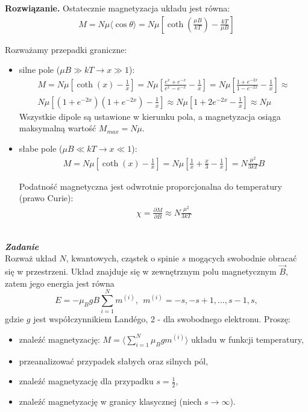 \documentclass[11pt,a4paper]{article}
\newcounter{zadanie}\newcommand{\zadanie}[1][]{\addtocounter{zadanie}{1} ~\\  {\bf \emph{Zadanie \arabic{zadanie} #1 }} \\}
\newenvironment{solution}{\vspace{1cm} \par\textbf{Rozwiązanie.} \vspace{1cm}}{}
\begin{document}
\begin{solution}
Ostatecznie magnetyzacja układu jest równa:
\begin{align*}
  M = N \mu \langle \cos\theta \rangle = N \mu \left[ \coth\left( \frac{\mu B}{kT} \right) - \frac{kT}{\mu B} \right]
\end{align*}

Rozważamy przepadki graniczne:
\begin{itemize}
  \item silne pole ($\mu B \gg kT \to x \gg 1$):
  \begin{align*}
    M = N \mu \left[ \coth(x) - \frac{1}{x} \right] = 
    N \mu \left[ \frac{e^{x} + e^{-x}}{e^{x} - e^{-x}} - \frac{1}{x} \right] = 
    N \mu \left[ \frac{1 + e^{-2x}}{1 - e^{-2x}} - \frac{1}{x} \right] \approx \\
    N \mu \left[ (1 + e^{-2x})(1 + e^{-2x}) - \frac{1}{x} \right] \approx 
    N \mu \left[ 1 + 2e^{-2x}- \frac{1}{x} \right] \approx  N\mu
  \end{align*}
   Wszystkie dipole są ustawione w kierunku pola, 
   a magnetyzacja osiąga maksymalną wartość $M_{max} = N\mu$.
  \item słabe pole ($\mu B \ll kT \to x \ll 1$):
  \begin{align*}
    M  = N \mu \left[ \coth(x) - \frac{1}{x} \right] =
    N \mu \left[ \frac{1}{x} + \frac{x}{3} - \frac{1}{x} \right] =
    N \frac{\mu^2}{3kT} B
  \end{align*}

  Podatność magnetyczna jest odwrotnie proporcjonalna do temperatury (prawo Curie):
\begin{align*}
  \chi = \frac{\partial M}{\partial B} \approx N \frac{\mu^2}{3kT}
\end{align*}

\end{itemize}

\newpage   
\end{solution}
\zadanie[]


Rozważ układ $N$, kwantowych, cząstek o spinie $s$ mogących swobodnie obracać się 
w przestrzeni. Układ znajduje się w zewnętrznym polu magnetycznym $\vec{B}$, 
zatem jego energia jest równa
\[
E = -\mu_{B}g B \sum_{i=1}^{N} m^{(i)},~~m^{(i)} = -s, -s + 1, \ldots, s - 1, s,
\]
gdzie $g$ jest współczynnikiem Landégo, 2 - dla swobodnego elektronu.
Proszę:
\begin{itemize}
\item znaleźć magnetyzację: $M = \langle \sum_{i=1}^{N} \mu_{B} g m^{(i)} \rangle$ układu w funkcji temperatury,
\item przeanalizować przypadek słabych oraz silnych pól,
\item znaleźć magnetyzację dla przypadku $s = \frac{1}{2}$,
\item znaleźć magnetyzację w granicy klasycznej (niech $s \to \infty$).
\end{itemize}
\end{document}
